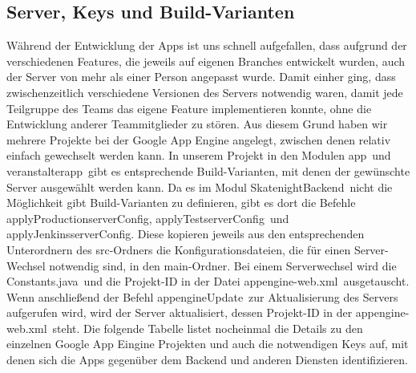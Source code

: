 \subsection{Server, Keys und Build-Varianten}
Während der Entwicklung der Apps ist uns schnell aufgefallen, dass aufgrund der verschiedenen Features, die jeweils auf eigenen Branches entwickelt wurden, auch der Server von mehr als einer Person angepasst wurde. Damit einher ging, dass zwischenzeitlich verschiedene Versionen des Servers notwendig waren, damit jede Teilgruppe des Teams das eigene Feature implementieren konnte, ohne die Entwicklung anderer Teammitglieder zu stören. Aus diesem Grund haben wir mehrere Projekte bei der Google App Engine angelegt, zwischen denen relativ einfach gewechselt werden kann. In unserem Projekt in den Modulen \glqq app\grqq\ und \glqq veranstalterapp\grqq\ gibt es entsprechende Build-Varianten, mit denen der gewünschte Server ausgewählt werden kann. Da es im Modul \glqq SkatenightBackend\grqq\ nicht die Möglichkeit gibt Build-Varianten zu definieren, gibt es dort die Befehle \glqq applyProductionserverConfig\grqq, \glqq applyTestserverConfig\grqq\ und \glqq applyJenkinsserverConfig\grqq. Diese kopieren jeweils aus den entsprechenden Unterordnern des src-Ordners die Konfigurationsdateien, die für einen Server-Wechsel notwendig sind, in den main-Ordner. Bei einem Serverwechsel wird die \glqq Constants.java\grqq\ und die Projekt-ID in der Datei \glqq appengine-web.xml\grqq\ ausgetauscht. Wenn anschließend der Befehl \glqq appengineUpdate\grqq\ zur Aktualisierung des Servers aufgerufen wird, wird der Server aktualisiert, dessen Projekt-ID in der \glqq appengine-web.xml\grqq\ steht. Die folgende Tabelle listet nocheinmal die Details zu den einzelnen Google App Eingine Projekten und auch die notwendigen Keys auf, mit denen sich die Apps gegenüber dem Backend und anderen Diensten identifizieren.

